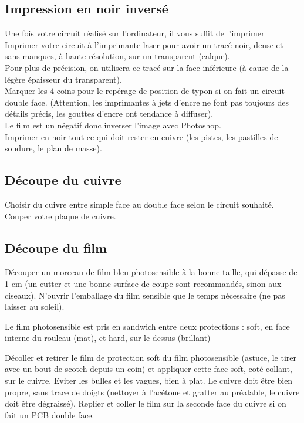 \subsection{Impression en noir inversé}

Une fois votre circuit réalisé sur l'ordinateur, il vous suffit de l'imprimer
Imprimer votre circuit à l'imprimante laser pour avoir un tracé noir, dense et sans manques, à haute résolution, sur un transparent (calque).\\
Pour plus de précision, on utilisera ce tracé sur la face inférieure (à cause de la légère épaisseur du transparent).\\

Marquer les 4 coins pour le repérage de position de typon si on fait un circuit double face. (Attention, les imprimantes à jets d'encre ne font pas toujours des détails précis, les gouttes d'encre ont tendance à diffuser).\\

Le film est un négatif donc inverser l'image avec Photoshop.\\

Imprimer en noir tout ce qui doit rester en cuivre (les pistes, les pastilles de soudure, le plan de masse).

\subsection{Découpe du cuivre}
Choisir du cuivre entre simple face au double face selon le circuit souhaité.
Couper votre plaque de cuivre.

\subsection{Découpe du film}
Découper un morceau de film bleu photosensible à la bonne taille, qui dépasse de 1 cm (un cutter et une bonne surface de coupe sont recommandés, sinon aux ciseaux). N'ouvrir l'emballage du film sensible que le temps nécessaire (ne pas laisser au soleil).

Le film photosensible est pris en sandwich entre deux protections : soft, en face interne du rouleau (mat), et hard, sur le dessus (brillant)

Décoller et retirer le film de protection soft du film photosensible (astuce, le tirer avec un bout de scotch depuis un coin) et appliquer cette face soft, coté collant, sur le cuivre. Eviter les bulles et les vagues, bien à plat. Le cuivre doit être bien propre, sans trace de doigts (nettoyer à l'acétone et gratter au préalable, le cuivre doit être dégraissé).
Replier et coller le film sur la seconde face du cuivre si on fait un PCB double face.

